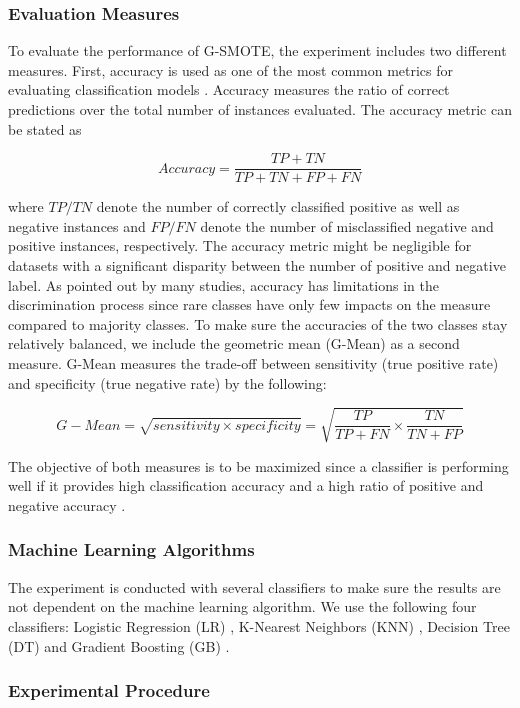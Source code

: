 \documentclass[parskip=full]{scrartcl}
\begin{document}
\subsubsection{Evaluation Measures}

To evaluate the performance of G-SMOTE, the experiment includes two different 
measures. First, accuracy is used as one of the most common metrics for 
evaluating classification models \cite{M.2015}. Accuracy measures 
the ratio of correct predictions over the total number of instances evaluated. 
The accuracy metric can be stated as

\[Accuracy = \frac{TP + TN}{TP + TN + FP + FN}\]

where $\mathit{TP/TN}$ denote the number of correctly classified positive as 
well as negative instances and $\mathit{FP/FN}$ denote the number of 
misclassified negative and positive instances, respectively. The accuracy 
metric might be negligible for datasets with a significant disparity between 
the number of positive and negative label. As pointed out by many studies, 
accuracy has limitations in the discrimination process since rare classes have 
only few impacts on the measure compared to majority classes. To make sure the 
accuracies of the two classes stay relatively balanced, we include the 
geometric mean (G-Mean) as a second measure. G-Mean measures the trade-off 
between sensitivity (true positive rate) and specificity (true negative rate) 
by the following:

\[G-Mean = \sqrt{sensitivity \times specificity} = \sqrt{\dfrac{TP}{TP + FN} 
\times \dfrac{TN}{TN + FP}}\]

The objective of both measures is to be maximized since a classifier is 
performing well if it provides high classification accuracy and a high ratio of 
positive and negative accuracy \cite{Han.2012}. 

\subsubsection{Machine Learning Algorithms}

The experiment is conducted with several classifiers to make sure the results 
are not dependent on the machine learning algorithm. We use the following four 
classifiers: Logistic Regression (LR) \cite{McCullagh.2019}, K-Nearest 
Neighbors (KNN) \cite{Cover.1967}, Decision Tree (DT) \cite{Salzberg.1994} and 
Gradient Boosting (GB) \cite{Friedman.2001}.

\subsubsection{Experimental Procedure}
\end{document}

